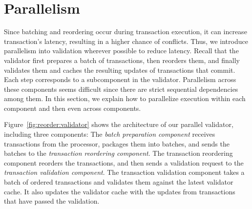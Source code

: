 

\section{Parallelism}
\label{sec:parallel}
\label{sec:validator_reordering:parallel}


Since batching and reordering occur during transaction execution, it can increase transaction's latency, 
resulting in a higher chance of conflicts. Thus, we introduce parallelism into validation wherever possible to reduce latency.
Recall that the validator first prepares a batch of transactions, then reorders them,  
and finally validates them and caches the resulting updates of transactions that commit.
 Each step corresponds to a subcomponent in the validator. Parallelism across these components seems difficult since there are strict sequential dependencies among them. In this section, we explain how to parallelize execution within each component and then even across components.


Figure~\ref{fig:reorder:validator} shows the architecture of our parallel validator, including three components: 
The \emph{batch preparation component} receives transactions from the processor, packages them into batches, and sends the batches to the \emph{transaction reordering component}. The transaction reordering component reorders the transactions, and then sends a validation request to the \emph{transaction validation component}. The transaction validation component takes a batch of ordered 
transactions
and validates them against the latest validator cache. It also updates the validator cache with the updates from transactions that have passed the validation. 

